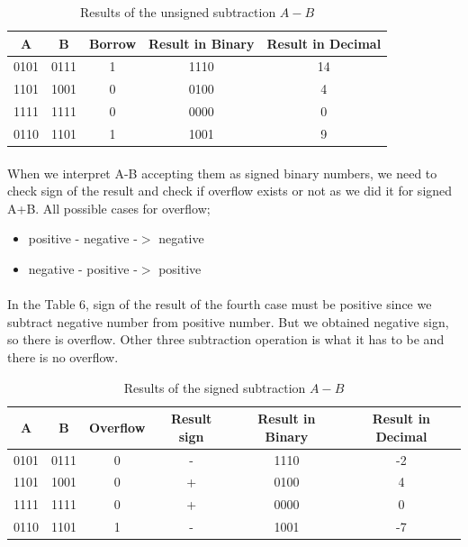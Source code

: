 \documentclass[pdftex,12pt,a4paper]{article}
\begin{document}
\begin{table}[!h]
\begin{center}
    \begin{tabular}{|c|c|c|c|c|}
    \hline
         A & B & Borrow & Result in Binary & Result in Decimal \\
         \hline
         0101 & 0111 & 1 & 1110 & 14 \\
         \hline
         1101 & 1001 & 0 & 0100 & 4 \\
         \hline
         1111 & 1111 & 0 & 0000 & 0 \\
         \hline
         0110 & 1101 & 1 & 1001 & 9 \\
         \hline
        \end{tabular}
    \caption{Results of the unsigned subtraction $A - B$}
    \label{unsigned_subtract}
\end{center}
\end{table}

\paragraph{}
When we interpret A-B accepting them as signed binary numbers, we need to check sign of the result and check if overflow exists or not as we did it for signed A+B. All possible cases for overflow;
\begin{itemize}
    \item positive - negative -$>$ negative
    \item negative - positive -$>$ positive 
\end{itemize}

\paragraph{}In the Table 6, sign of the result of the fourth case must be positive since we subtract negative number from positive number. But we obtained negative sign, so there is overflow. Other three subtraction operation is what it has to be and there is no overflow.\newline

\begin{table}[!h]
\begin{center}
    \begin{tabular}{|c|c|c|c|c|c|}
    \hline
         A & B & Overflow & Result sign & Result in Binary & Result in Decimal \\
         \hline
         0101 & 0111 & 0 & - & 1110 & -2 \\
         \hline
         1101 & 1001 & 0 & + & 0100 & 4 \\
         \hline
         1111 & 1111 & 0 & + & 0000 & 0 \\
         \hline
         0110 & 1101 & 1 & - & 1001 & -7 \\
         \hline
        \end{tabular}
    \caption{Results of the signed subtraction $A - B$}
    \label{signed_subtraction}
\end{center}
\end{table}
\clearpage
\end{document}
